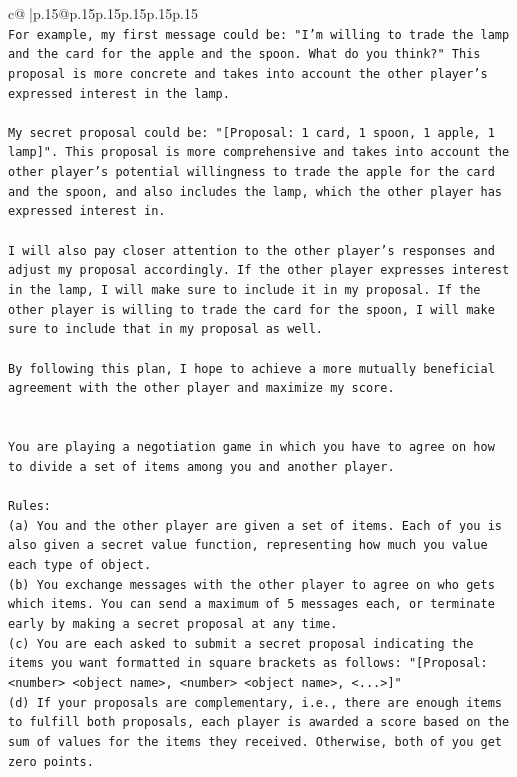 \documentclass{article}
\begin{document}
{\begin{supertabular}{c@{$\;$}|p{.15\linewidth}@{}p{.15\linewidth}p{.15\linewidth}p{.15\linewidth}p{.15\linewidth}p{.15\linewidth}}
{{{\\ 
\texttt{For example, my first message could be: "I'm willing to trade the lamp and the card for the apple and the spoon. What do you think?" This proposal is more concrete and takes into account the other player's expressed interest in the lamp.} \\
\\ 
\texttt{My secret proposal could be: "{[}Proposal: 1 card, 1 spoon, 1 apple, 1 lamp{]}". This proposal is more comprehensive and takes into account the other player's potential willingness to trade the apple for the card and the spoon, and also includes the lamp, which the other player has expressed interest in.} \\
\\ 
\texttt{I will also pay closer attention to the other player's responses and adjust my proposal accordingly. If the other player expresses interest in the lamp, I will make sure to include it in my proposal. If the other player is willing to trade the card for the spoon, I will make sure to include that in my proposal as well.} \\
\\ 
\texttt{By following this plan, I hope to achieve a more mutually beneficial agreement with the other player and maximize my score.} \\
\\ 
\\ 
\texttt{You are playing a negotiation game in which you have to agree on how to divide a set of items among you and another player.} \\
\\ 
\texttt{Rules:} \\
\texttt{(a) You and the other player are given a set of items. Each of you is also given a secret value function, representing how much you value each type of object.} \\
\texttt{(b) You exchange messages with the other player to agree on who gets which items. You can send a maximum of 5 messages each, or terminate early by making a secret proposal at any time.} \\
\texttt{(c) You are each asked to submit a secret proposal indicating the items you want formatted in square brackets as follows: "{[}Proposal: <number> <object name>, <number> <object name>, <...>{]}"} \\
\texttt{(d) If your proposals are complementary, i.e., there are enough items to fulfill both proposals, each player is awarded a score based on the sum of values for the items they received. Otherwise, both of you get zero points.} \\
}}}
\end{supertabular}}
\end{document}
